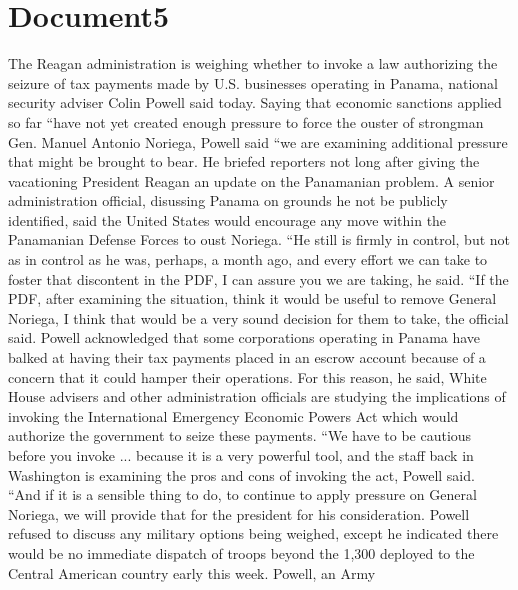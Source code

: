 \documentclass{article}
\begin{document}
\color[rgb]{0,0,0}\section{Document5}
\color[rgb]{0.9137254901960784,0.34509803921568627,0.1568627450980392}The Reagan administration is weighing whether to invoke a law authorizing the seizure of tax payments made by U.S. businesses operating in Panama, national security adviser Colin \color[rgb]{0.8666666666666667,0.11372549019607843,0.5411764705882353}Powell said today. Saying that economic sanctions applied so far ``have not yet created enough pressure to \color[rgb]{0.9137254901960784,0.34509803921568627,0.1568627450980392}force the ouster of strongman Gen. Manuel Antonio Noriega, Powell said ``we are examining additional pressure that might be brought to bear. He briefed \color[rgb]{0.8666666666666667,0.11372549019607843,0.5411764705882353}reporters not long after giving the vacationing President \color[rgb]{0.9137254901960784,0.34509803921568627,0.1568627450980392}Reagan an update on the Panamanian problem. A senior administration official, disussing Panama on grounds he not be publicly identified, said the United States would encourage any move within the Panamanian Defense Forces to oust Noriega. ``He still is firmly in control, but not as in control as he was, perhaps, a month ago, and every effort we can take to foster that \color[rgb]{0.3333333333333333,0.6588235294117647,0.9686274509803922}discontent in the PDF, I \color[rgb]{0.9137254901960784,0.34509803921568627,0.1568627450980392}can assure you we are taking, he said. ``If the PDF, after examining the situation, \color[rgb]{0.3333333333333333,0.6588235294117647,0.9686274509803922}think it would be useful to \color[rgb]{0.9137254901960784,0.34509803921568627,0.1568627450980392}remove General Noriega, I think that would be a very sound decision for them to take, the official said. Powell acknowledged that some corporations operating in Panama have balked at having their tax payments placed in an escrow account because of a concern that it could hamper their operations. For this reason, he said, White House advisers and other administration officials are studying the implications of invoking the \color[rgb]{0.8666666666666667,0.11372549019607843,0.5411764705882353}International Emergency Economic Powers \color[rgb]{0.9137254901960784,0.34509803921568627,0.1568627450980392}Act  which would authorize the government to seize these payments. ``We have to be \color[rgb]{0.8666666666666667,0.11372549019607843,0.5411764705882353}cautious before \color[rgb]{0.9137254901960784,0.34509803921568627,0.1568627450980392}you invoke ... because it is a very powerful tool, and the staff back in Washington is examining the pros and cons of invoking the act, Powell said. ``And if it is a sensible thing to do, to continue to apply pressure on General Noriega, we will provide that for the president for his consideration. Powell refused to discuss any military options being weighed, except he \color[rgb]{0.8666666666666667,0.11372549019607843,0.5411764705882353}indicated there would be no immediate dispatch of troops beyond the 1,300 deployed to the Central American country early this week. Powell, an Army 
\end{document}
